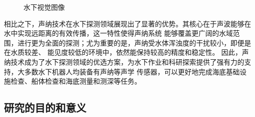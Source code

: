 \begin{figure}[!ht]
  \setlength{\subfigcapskip}{-1bp}
  \centering
  \begin{minipage}{\textwidth}
    \centering
    \hspace{0.5em}
  \end{minipage}
  \caption{水下视觉图像}
  \label{fig:水下视觉图像} %
\end{figure}

相比之下，声纳技术在水下探测领域展现出了显著的优势。其核心在于声波能够在水中实现远距离的有效传播，这一特性使得声纳系统
能够覆盖更广阔的水域范围，进行更为全面的探测；尤为重要的是，声纳受水体浑浊度的干扰较小，即便是在水质较差、
能见度较低的环境中，依然能保持较高的精度和稳定性。
因此，声纳技术成为了水下探测领域的优选方案，为水下作业和科研探索提供了强有力的支持，大多数水下机器人均装备有声纳等声学
传感器，可以更好地完成海底基础设施检查、船体检查\cite{kaess2010towards}和海底测量和测深\cite{fallon2011efficient}等任务。

\subsection{研究的目的和意义}

